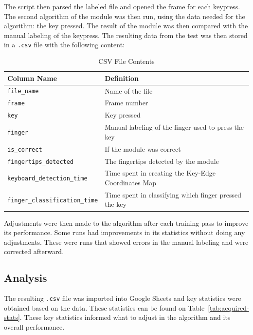 \documentclass{report}
\begin{document}
The script then parsed the labeled file and opened the frame for each keypress.
The second algorithm of the module was then run, using the data needed for the
algorithm: the key pressed. The result of the module was then compared with the
manual labeling of the keypress. The resulting data from the test was then
stored in a \texttt{.csv} file with the following content:

\begin{table}[H]
	\small
	\centering
	\begin{tabular}{ p{} p{} }
		\toprule
		Column Name                           & Definition                                             \\
		\midrule
		\texttt{file\_name}                   & Name of the file                                       \\
		\texttt{frame}                        & Frame number                                           \\
		\texttt{key}                          & Key pressed                                            \\
		\texttt{finger}                       & Manual labeling of the finger used to press the key    \\
		\texttt{is\_correct}                  & If the module was correct                              \\
		\texttt{fingertips\_detected}         & The fingertips detected by the module                  \\
		\texttt{keyboard\_detection\_time}    & Time spent in creating the Key-Edge Coordinates Map    \\
		\texttt{finger\_classification\_time} & Time spent in classifying which finger pressed the key \\
		\bottomrule
	\end{tabular}
	\caption{\label{tab:csv-output}CSV File Contents}
\end{table}

Adjustments were then made to the algorithm after each training pass to improve
its performance. Some runs had improvements in its statistics without doing any
adjustments. These were runs that showed errors in the manual labeling and
were corrected afterward.

\subsection{Analysis}
The resulting \texttt{.csv} file was imported into Google Sheets and key
statistics were obtained based on the data. These statistics can be found on
Table~\ref{tab:acquired-stats}. These key statistics informed what to adjust in
the algorithm and its overall performance.
\end{document}
